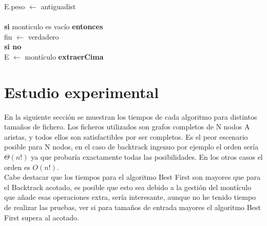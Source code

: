 \documentclass[es]{ifirak}
\begin{document}
{\hspace*{0.6cm}	\hspace*{0.6cm}	\hspace*{3.6cm}	 E.peso $\leftarrow$ antiguadist\\	
\\
\hspace*{1.4cm}	\textbf{si} monticulo es vacío \textbf{entonces}\\ 		
		\hspace*{2cm} fin  $\leftarrow$ verdadero \\
\hspace*{1.4cm}	\textbf{si no}\\
 \hspace*{2cm} E $\leftarrow$ montículo \textbf{extraerCima}\\ 
}

\pagebreak

\section{Estudio experimental}

En la siguiente sección se muestran los tiempos de cada algoritmo para distintos tamaños de fichero. Los ficheros utilizados son grafos completos de N nodos A aristas, y todos ellos son satisfactibles por ser completos. Es el peor escenario posible para N nodos, en el caso de backtrack ingenuo por ejemplo el orden sería $\Theta(n!)$ ya que probaría exactamente todas las posibilidades. En los otros casos el orden es $O(n!)$.\\

Cabe destacar que los tiempos para el algoritmo Best First son mayores que para el Backtrack acotado, es posible que esto sea debido a la gestión del montículo que añade esas operaciones extra, sería interesante, aunque no he tenido tiempo de realizar las pruebas, ver si para tamaños de entrada mayores el algoritmo Best First supera al acotado.
\end{document}
